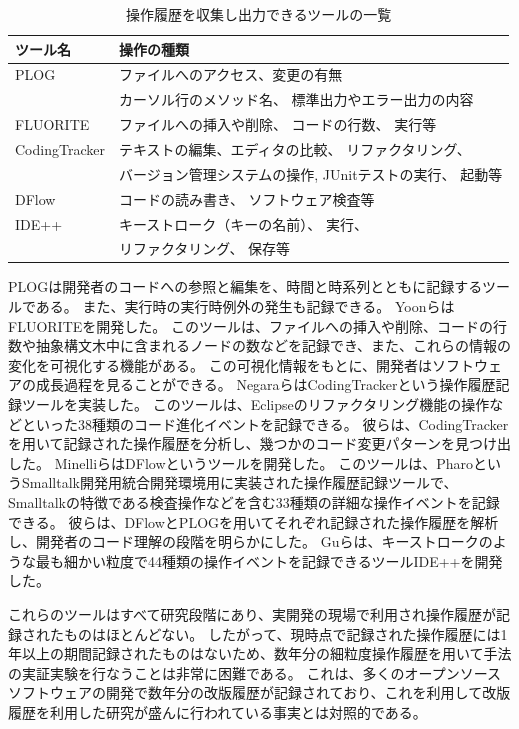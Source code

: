 \documentclass[a4paper]{jsbook}
\begin{document}
\begin{table}[bt]
  \caption{操作履歴を収集し出力できるツールの一覧}
  \centering
  \begin{tabular}{ll}
    \hline
    ツール名& 操作の種類\\
    \hline
    PLOG\cite{plog} & ファイルへのアクセス、変更の有無\\
           & カーソル行のメソッド名、 標準出力やエラー出力の内容 \\
    FLUORITE\cite{yoon:2011} & ファイルへの挿入や削除、
          コードの行数、 実行等  \\
    CodingTracker & 
    テキストの編集、エディタの比較、 リファクタリング、\\
    \cite{Negara:2012}\cite{Negara:2014}  & 
    バージョン管理システムの操作, 
    JUnitテストの実行、 起動等\\
    {\sc DFlow}\cite{minelli:2014} & コードの読み書き、 ソフトウェア検査等\\
    IDE++\cite{Gu:2014} & キーストローク（キーの名前）、 実行、 \\
                        & リファクタリング、 保存等\\
    \hline
  \end{tabular}
\label{finegrained}
\end{table}

PLOG\cite{plog}は開発者のコードへの参照と編集を、時間と時系列とともに記録するツールである。
また、実行時の実行時例外の発生も記録できる。
YoonらはFLUORITE\cite{yoon:2011}を開発した。
このツールは、ファイルへの挿入や削除、コードの行数や抽象構文木中に含まれるノードの数などを記録でき、また、これらの情報の変化を可視化する機能がある。
この可視化情報をもとに、開発者はソフトウェアの成長過程を見ることができる。
NegaraらはCodingTracker\cite{Negara:2012}という操作履歴記録ツールを実装した。
このツールは、Eclipseのリファクタリング機能の操作などといった38種類のコード進化イベントを記録できる。
彼らは、CodingTrackerを用いて記録された操作履歴を分析し、幾つかのコード変更パターンを見つけ出した\cite{Negara:2014}。
Minelliらは{\sc DFlow}というツールを開発した。
このツールは、PharoというSmalltalk開発用統合開発環境用に実装された操作履歴記録ツールで、Smalltalkの特徴である検査操作などを含む33種類の詳細な操作イベントを記録できる。
彼らは、{\sc DFlow}とPLOGを用いてそれぞれ記録された操作履歴を解析し、開発者のコード理解の段階を明らかにした。
Guらは、キーストロークのような最も細かい粒度で44種類の操作イベントを記録できるツールIDE++\cite{Gu:2014}を開発した。

これらのツールはすべて研究段階にあり、実開発の現場で利用され操作履歴が記録されたものはほとんどない。
したがって、現時点で記録された操作履歴には1年以上の期間記録されたものはないため、数年分の細粒度操作履歴を用いて手法の実証実験を行なうことは非常に困難である。
これは、多くのオープンソースソフトウェアの開発で数年分の改版履歴が記録されており、これを利用して改版履歴を利用した研究が盛んに行われている事実とは対照的である。
\end{document}
